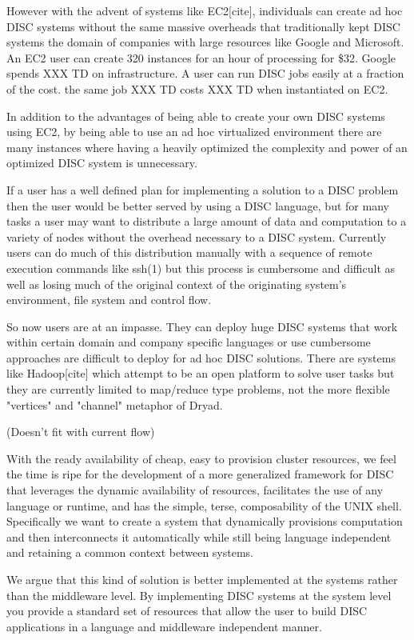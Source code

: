 \documentclass[11pt, letterpaper]{article}
\begin{document}
However with the advent of systems like EC2[cite], individuals can create ad hoc DISC systems without the same massive overheads that traditionally kept DISC systems the domain of companies with large resources like Google and Microsoft. An EC2 user can create 320 instances for an hour of processing for \$32. Google spends XXX TD on infrastructure. A user can run DISC jobs easily at a fraction of the cost. the same job XXX TD costs XXX TD when instantiated on EC2.

In addition to the advantages of being able to create your own DISC systems using EC2, by being able to use an ad hoc virtualized environment there are many instances where having a heavily optimized the complexity and power of an optimized DISC system is unnecessary. 

If a user has a well defined plan for implementing a solution to a DISC problem then the user would be better served by using a DISC language, but for many tasks a user may want to distribute a large amount of data and computation to a variety of nodes without the overhead necessary to a DISC system. Currently users can do much of this distribution manually with a sequence of remote execution commands like ssh(1) but this process is cumbersome and difficult as well as losing much of the original context of the originating system's environment, file system and control flow.

So now users are at an impasse. They can deploy huge DISC systems that work within certain domain and company specific languages or use cumbersome approaches are difficult to deploy for ad hoc DISC solutions. There are systems like Hadoop[cite] which attempt to be an open platform to solve user tasks but they are currently limited to map/reduce type problems, not the more flexible "vertices" and "channel" metaphor of Dryad.

(Doesn't fit with current flow)

With the ready availability of cheap, easy to provision cluster resources, we feel the time is ripe for the development of a more generalized framework for DISC that leverages the dynamic availability of resources, facilitates the use of any language or runtime, and has the simple, terse, composability of the UNIX shell. Specifically we want to create a system that dynamically provisions computation and then interconnects it automatically while still being language independent and retaining a common context between systems.
  

We argue that this kind of solution is better implemented at the systems rather than the middleware level. By implementing DISC systems at the system level you provide a standard set of resources that allow the user to build DISC applications in a language and middleware independent manner. 
\end{document}
